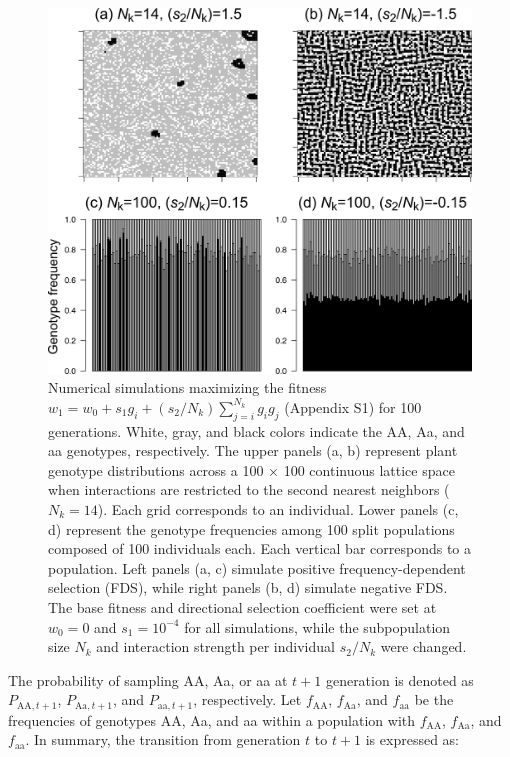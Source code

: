 \documentclass[12pt,]{article}
\begin{document}
\begin{figure}[]
  \includegraphics[width=0.8\linewidth]{IsingExample.png}
  \caption{Numerical simulations maximizing the fitness $w_1 = w_0 + s_1g_i + (s_2 / {N_k})\sum^{N_k}_{j=i}{g_ig_j}$ (Appendix S1) for 100 generations. White, gray, and black colors indicate the AA, Aa, and aa genotypes, respectively. The upper panels (a, b) represent plant genotype distributions across a 100 $\times$ 100 continuous lattice space when interactions are restricted to the second nearest neighbors ($N_k=14$). Each grid corresponds to an individual. Lower panels (c, d) represent the genotype frequencies among 100 split populations composed of 100 individuals each. Each vertical bar corresponds to a population. Left panels (a, c) simulate positive frequency-dependent selection (FDS), while right panels (b, d) simulate negative FDS. The base fitness and directional selection coefficient were set at $w_0 = 0$ and $s_1 = 10^{-4}$ for all simulations, while the subpopulation size $N_k$ and interaction strength per individual $s_2/N_k$ were changed.}
  \label{figS1:Ising}
\end{figure}

The probability of sampling AA, Aa, or aa at $t+1$ generation is denoted as $P_{\mathrm{AA},t+1}$, $P_{\mathrm{Aa},t+1}$, and $P_{\mathrm{aa},t+1}$, respectively. Let $f_\mathrm{AA}$, $f_\mathrm{Aa}$, and $f_\mathrm{aa}$ be the frequencies of genotypes AA, Aa, and aa within a population with $f_\mathrm{AA}$, $f_\mathrm{Aa}$, and $f_\mathrm{aa}$. In summary, the transition from generation $t$ to $t+1$ is expressed as:
\end{document}
